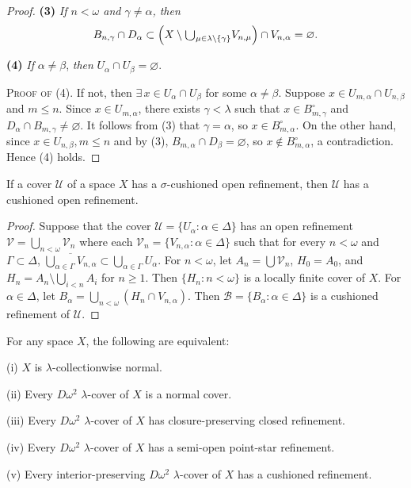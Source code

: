 \documentclass[main.tex]{subfiles}
\begin{document}
\begin{proof}
\textbf{(3)} \textit{If $n < \omega$ and $\gamma\ne \alpha$, then}
$$B_{n,\gamma} \cap D_\alpha \subset 
\left(X\setminus \raisebox{-2pt}{\scalebox{1.5}{$\cup$}}_{\mu\in\lambda\setminus\{\gamma\}}V_{n,\mu}\right)
\cap V_{n,\alpha} = \varnothing.$$

\textbf{(4)} \textit{If} $\alpha \neq \beta$, \textit{then} $U_\alpha \cap U_\beta = \varnothing$.

\noindent\textsc{Proof of (4)}.  If not, then $\exists \, x\in U_{\alpha} \cap U_{\beta} $ 
for some 
$\alpha\ne\beta$. Suppose  $x \in U_{m,\alpha} \cap U_{n,\beta}$ and
$m\le n$. Since $x \in U_{m,\alpha}$, there exists 
$\gamma < \lambda$ such that $x \in B_{m,\gamma}^\circ$ and 
$D_\alpha \cap B_{m,\gamma} \neq \varnothing$. 
It follows from (3) that $\gamma = \alpha$, so $x\in B_{m,\alpha}^\circ$. 
On the other hand, since $x\in U_{n, \beta}, m\le n$ and by (3),
$B_{m,\alpha} \cap D_\beta = \varnothing$, so $x\notin B_{m,\alpha}^\circ$, 
a contradiction. Hence (4) holds.
\end{proof}


{\lemma{} \label{lem:8.1.4}
If a cover $\mathscr{U}$ of a space $X$ has a $\sigma$-cushioned open refinement, then $\mathscr{U}$ has a cushioned open refinement.
}

\begin{proof}
Suppose that the cover $\mathscr{U} = \{U_\alpha: \alpha \in \Delta\}$ 
has an  open refinement $\mathscr{V} = \bigcup_{n < \omega} \mathscr{V}_n$ 
where  each $\mathscr{V}_n = \{V_{n,\alpha}: \alpha \in \Delta\}$ such that 
for every  $n < \omega$ and $\Gamma \subset \Delta$, 
$\overline{\bigcup_{\alpha \in \Gamma} V_{n,\alpha}} 
\subset \bigcup_{\alpha \in \Gamma} U_\alpha$. 
For $n < \omega$, let $A_n = \bigcup \mathscr{V}_n$, $H_0 = A_0$, and 
$H_n = A_n \setminus \bigcup_{i < n} A_i$ for $n \ge 1$. 
Then $\{H_n: n < \omega\}$ is a 
 locally finite  cover of $X$. For $\alpha \in \Delta$, let 
$B_\alpha = \bigcup_{n < \omega} (H_n \cap V_{n,\alpha})$. 
Then $\mathscr{B} = \{B_\alpha: \alpha \in \Delta\}$ 
is a cushioned refinement of $\mathscr{U}$.
\end{proof}

 {\theorem{\label{th:8.1.5}} 
For any space $X$, the following are equivalent:

\textup{(i)}  $X$ is $\lambda$-collectionwise normal.

\textup{(ii)}  Every $D\omega^2$ $\lambda$-cover of $X$ is a normal cover.

\textup{(iii)}  Every $D\omega^2$ $\lambda$-cover of $X$ has closure-preserving
 closed refinement.

\textup{(iv)}  Every $D\omega^2$ $\lambda$-cover of $X$ has a semi-open point-star refinement.

\textup{(v)}  Every interior-preserving
$D\omega^2$ $\lambda$-cover of $X$ has a cushioned refinement.
}
\end{document}
